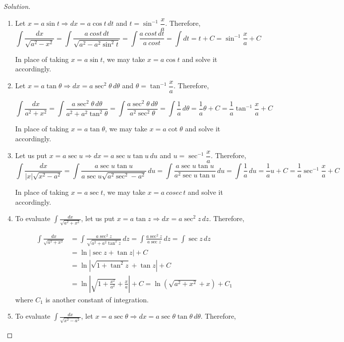 \documentclass{book}
\theoremstyle{definition}
\newenvironment{solution}
    {\begin{proof}[Solution]}
    {\end{proof}}
\begin{document}
\begin{solution}
\begin{enumerate}[label=(\roman*)]
\item Let $x=a \sin t \Rightarrow dx=a\cos t\,dt$ and $t=\sin^{-1}\dfrac{x}{a}$. Therefore,
\[
\int\frac{dx}{\sqrt{a^2-x^2}}=\int\frac{a\ cost\,dt}{\sqrt{a^2-a^2\sin^2t}}=\int\frac{a\ cost\,dt}{{a\ cost}}=\int dt=t+C=\sin^{-1}\frac{x}{a}+C
\]

In place of taking $x=a \sin t$, we may take $x=a \cos t$ and solve it accordingly.

\item Let $x=a \tan \theta \Rightarrow dx=a\sec^2 \theta\,d\theta$ and $\theta=\tan^{-1}\dfrac{x}{a}$. Therefore,

\[
\int\frac{dx}{a^2+x^2}=\int\frac{a\sec^2 \theta\,d\theta}{a^2+a^2\tan^2\theta}=\int\frac{a\sec^2 \theta\,d\theta}{a^2\sec^2\theta}=\int\frac{1}{a}\, d\theta=\frac{1}{a}\theta+C=\frac{1}{a}\tan^{-1}\frac{x}{a}+C
\]

In place of taking $x=a \tan \theta$, we may take $x=a \cot \theta$ and solve it accordingly.

\item Let us put $x=a\sec u \Rightarrow dx=a\sec u\tan u\,du$ and $u=\sec^{-1}\dfrac{x}{a}$. Therefore,
\[
\int \frac{dx}{|x|\sqrt{x^2-a^2}}=\int \frac{a\sec u\tan u}{a\sec u\sqrt{a^2\sec^2-a^2}}\,du=\int \frac{a\sec u\tan u}{a^2\sec u\tan u}\,du=\int \frac{1}{a}\,du= \frac{1}{a}u+C=\frac{1}{a}\sec^{-1}\frac{x}{a}+C
\]

In place of taking $x=a \sec t$, we may take $x=a \ cosec\,t$ and solve it accordingly.

\item To evaluate $\displaystyle\int \frac{dx}{\sqrt{a^2+x^2}}$, let us put $x=a\tan z \Rightarrow dx=a\sec^2z\,dz$. Therefore,

\begin{align*}
\int \frac{dx}{\sqrt{a^2+x^2}}&=\int \frac{a\sec^2z}{\sqrt{a^2+a^2\tan^2z}}\,dz=\int \frac{a\sec^2z}{a\sec z}\,dz = \int \sec z\,dz \\ 
&= \ln\left|\sec z+\tan z\right|+C \\
&= \ln\left|\sqrt{1+\tan^2z}+\tan z\right|+C \\
&= \ln\left|\sqrt{1+\frac{x^2}{a^2}}+\frac{x}{a}\right|+C = \ln(\sqrt{a^2+x^2}+x)+C_1
\end{align*}
where $C_1$ is another constant of integration.

\item To evaluate $\displaystyle\int \frac{dx}{\sqrt{x^2-a^2}}$, let $x=a\sec \theta \Rightarrow dx=a\sec\theta\tan\theta\,d\theta$. Therefore,


\end{enumerate}
\end{solution}
\end{document}
